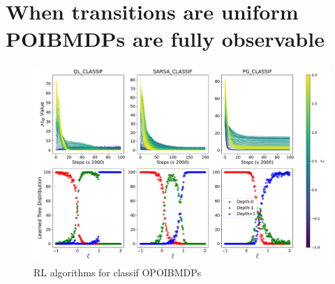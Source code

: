 \chapter{When transitions are uniform POIBMDPs are fully observable}
\begin{figure}
    \centering
    \includegraphics[width=1\textwidth]{images/images_part1/quick_plot_combined_classif.pdf}
    \caption{RL algorithms for classif OPOIBMDPs}\label{fig:rl-poibmdp}
\end{figure}
